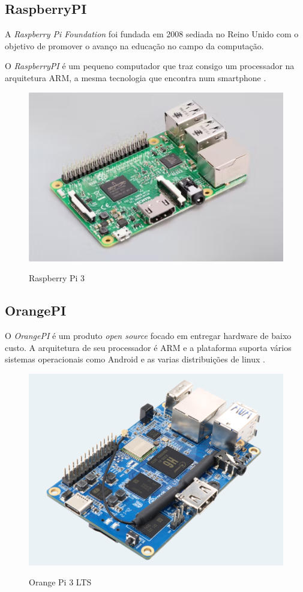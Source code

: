 \subsection{RaspberryPI}

A \textit{Raspberry Pi Foundation} foi fundada em 2008 sediada no Reino Unido com o objetivo de promover o avanço na educação no campo da computação. \cite{rasp}

O \textit{RaspberryPI} é um pequeno computador que traz consigo um processador na arquitetura ARM, a mesma tecnologia que encontra num smartphone \cite{rasp}.

\begin{figure}[!htbp]
  \caption{Raspberry Pi 3}
  \includegraphics[scale=0.4]{images/rasp.png}
  \label{figura:rasp}
\end{figure}

\subsection{OrangePI}

O \textit{OrangePI} é um produto \textit{open source} focado em entregar hardware de baixo custo. A arquitetura de seu processador é ARM e a plataforma suporta vários sistemas operacionais como Android e as varias distribuições de linux \cite{orangepi}.

\begin{figure}[!htbp]
  \caption{Orange Pi 3 LTS}
  \includegraphics[scale=0.4]{images/orange.png}
  \label{figura:orange}
\end{figure}

